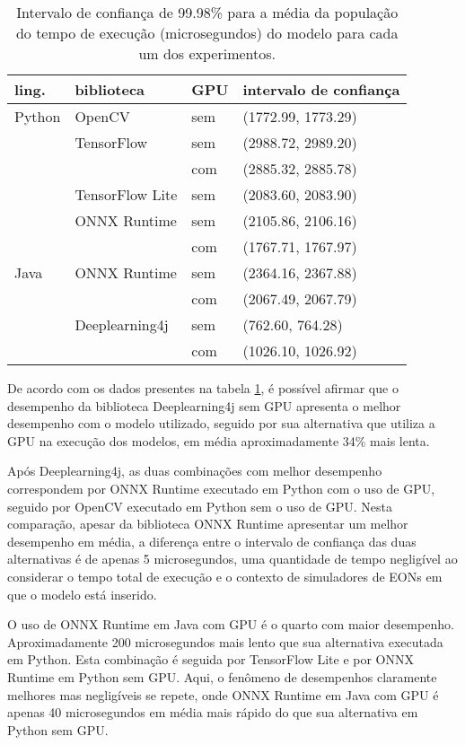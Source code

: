 \begin{table}
  \centering
  \begin{tabular}{llll}
    \toprule
    ling.  & biblioteca      & GPU & intervalo de confiança \\
    \midrule
    Python & OpenCV          & sem & (1772.99, 1773.29)     \\
           & TensorFlow      & sem & (2988.72, 2989.20)     \\
           &                 & com & (2885.32, 2885.78)     \\
           & TensorFlow Lite & sem & (2083.60, 2083.90)     \\
           & ONNX Runtime    & sem & (2105.86, 2106.16)     \\
           &                 & com & (1767.71, 1767.97)     \\
    Java   & ONNX Runtime    & sem & (2364.16, 2367.88)     \\
           &                 & com & (2067.49, 2067.79)     \\
           & Deeplearning4j  & sem & (762.60, 764.28)       \\
           &                 & com & (1026.10, 1026.92)     \\

    \bottomrule
  \end{tabular}
  \caption{Intervalo de confiança de 99.98\% para a média da população do tempo de execução (microsegundos) do modelo para cada um dos experimentos.}
  \label{tab:ci}
\end{table}

De acordo com os dados presentes na tabela \ref{tab:ci}, é possível afirmar que o desempenho da biblioteca Deeplearning4j sem GPU apresenta o melhor desempenho com o modelo utilizado, seguido por sua alternativa que utiliza a GPU na execução dos modelos, em média aproximadamente 34\% mais lenta.

Após Deeplearning4j, as duas combinações com melhor desempenho correspondem por ONNX Runtime executado em Python com o uso de GPU, seguido por OpenCV executado em Python sem o uso de GPU. Nesta comparação, apesar da biblioteca ONNX Runtime apresentar um melhor desempenho em média, a diferença entre o intervalo de confiança das duas alternativas é de apenas 5 microsegundos, uma quantidade de tempo negligível ao considerar o tempo total de execução e o contexto de simuladores de EONs em que o modelo está inserido.

O uso de ONNX Runtime em Java com GPU é o quarto com maior desempenho. Aproximadamente 200 microsegundos mais lento que sua alternativa executada em Python. Esta combinação é seguida por TensorFlow Lite e por ONNX Runtime em Python sem GPU. Aqui, o fenômeno de desempenhos claramente melhores mas negligíveis se repete, onde ONNX Runtime em Java com GPU é apenas 40 microsegundos em média mais rápido do que sua alternativa em Python sem GPU.

